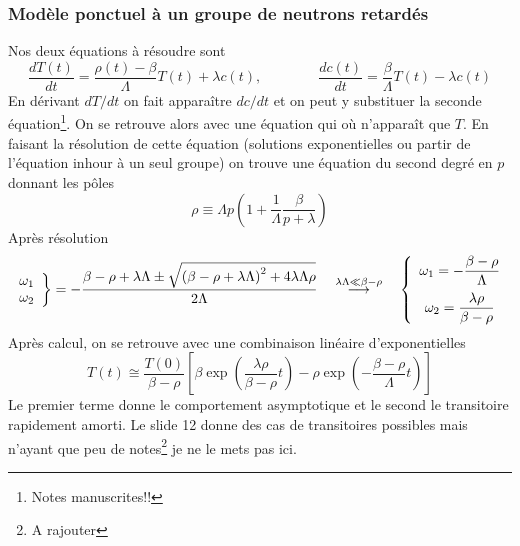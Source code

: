 \subsubsection{Modèle ponctuel à un groupe de neutrons retardés}
Nos deux équations à résoudre sont
\begin{equation}
\frac{{dT(t)}}{{dt}} = \frac{{\rho (t) - \beta }}{\Lambda }T(t) + \lambda c(t),\qquad\qquad
\frac{{dc(t)}}{{dt}} = \frac{\beta }{\Lambda }T(t) - \lambda c(t)
\end{equation}
En dérivant $dT/dt$ on fait apparaître $dc/dt$ et on peut y substituer la seconde équation\footnote{Notes manuscrites!!}. On se retrouve alors avec une équation qui où n'apparaît que $T$. En 
faisant la résolution de cette équation (solutions exponentielles ou partir de l'équation inhour 
à un seul groupe) on trouve une équation du second degré en $p$ donnant les pôles
\begin{equation}
\rho  \equiv \Lambda p\left(   \right.1 + \frac{1}{\Lambda }\frac{\beta }{{p + \lambda }}\left.    \right)
\end{equation}
Après résolution 
\begin{equation}
\left. {\begin{array}{*{20}{c}}
{{\omega _1}}\\
{{\omega _2}}
\end{array}} \right\} =  - \frac{{\beta  - \rho  + \lambda \Lambda  \pm \sqrt {{{(\beta  - \rho  + \lambda \Lambda )}^2} + 4\lambda \Lambda \rho } }}{{2\Lambda }}\quad\overset{{\lambda \Lambda  \ll \beta  - \rho }}{\longrightarrow} \quad
\left\{ {\begin{array}{*{20}{c}}
\DS{{\omega _1} =  - \frac{{\beta  - \rho }}{\Lambda }}\vspace{2mm}\\
\DS{{\omega _2} = \frac{{\lambda \rho }}{{\beta  - \rho }}}
\end{array}} \right.
\end{equation}
Après calcul, on se retrouve avec une combinaison linéaire d'exponentielles
\begin{equation}
T(t) \cong \frac{{T(0)}}{{\beta  - \rho }}\left[ {\beta \exp \left( {\frac{{\lambda \rho }}{{\beta  - \rho }}t} \right)} \right. - \rho \exp \left. {\left( { - \frac{{\beta  - \rho }}{\Lambda }t} \right)} \right]
\label{eq:Ch5.1}
\end{equation}
Le premier terme donne le comportement asymptotique et le second le transitoire rapidement amorti. Le 
slide 12 donne des cas de transitoires possibles mais n'ayant que peu de notes\footnote{A rajouter} 
je ne le mets pas ici.


